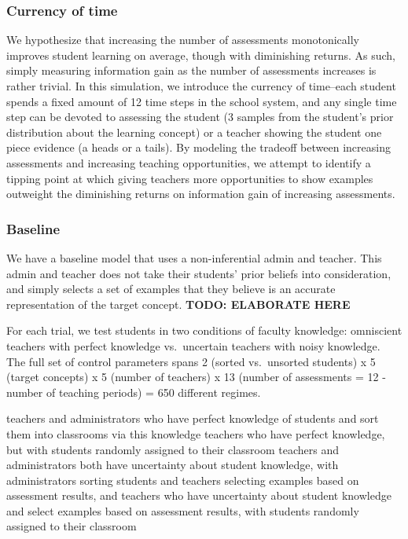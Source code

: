 \documentclass[10pt, letterpaper]{article}
\begin{document}
\subsubsection{Currency of time}\label{currency-of-time}

We hypothesize that increasing the number of assessments monotonically
improves student learning on average, though with diminishing returns.
As such, simply measuring information gain as the number of assessments
increases is rather trivial. In this simulation, we introduce the
currency of time--each student spends a fixed amount of 12 time steps in
the school system, and any single time step can be devoted to assessing
the student (3 samples from the student's prior distribution about the
learning concept) or a teacher showing the student one piece evidence (a
heads or a tails). By modeling the tradeoff between increasing
assessments and increasing teaching opportunities, we attempt to
identify a tipping point at which giving teachers more opportunities to
show examples outweight the diminishing returns on information gain of
increasing assessments.

\subsubsection{Baseline}\label{baseline}

We have a baseline model that uses a non-inferential admin and teacher.
This admin and teacher does not take their students' prior beliefs into
consideration, and simply selects a set of examples that they believe is
an accurate representation of the target concept. \textbf{TODO:
ELABORATE HERE}

For each trial, we test students in two conditions of faculty knowledge:
omniscient teachers with perfect knowledge vs.~uncertain teachers with
noisy knowledge. The full set of control parameters spans 2 (sorted
vs.~unsorted students) x 5 (target concepts) x 5 (number of teachers) x
13 (number of assessments = 12 - number of teaching periods) = 650
different regimes.

teachers and administrators who have perfect knowledge of students and
sort them into classrooms via this knowledge teachers who have perfect
knowledge, but with students randomly assigned to their classroom
teachers and administrators both have uncertainty about student
knowledge, with administrators sorting students and teachers selecting
examples based on assessment results, and teachers who have uncertainty
about student knowledge and select examples based on assessment results,
with students randomly assigned to their classroom
\end{document}
